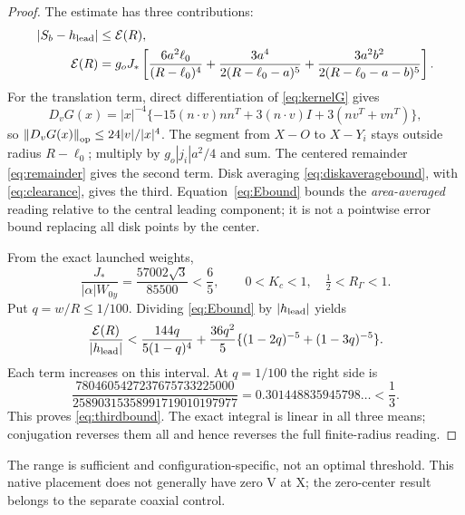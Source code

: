 \begin{proof}
The estimate has three contributions:
\begin{align}
|S_b-h_{\rm lead}|&\le\mathcal E(R),\label{eq:Ebound}\\
\mathcal E(R)&=g_oJ_*\left[
\frac{6a^2\ell_0}{(R-\ell_0)^4}
+\frac{3a^4}{2(R-\ell_0-a)^5}
+\frac{3a^2b^2}{2(R-\ell_0-a-b)^5}
\right].\notag
\end{align}
For the translation term, direct differentiation of \eqref{eq:kernelG} gives
\begin{equation}\label{eq:DG}
D_vG(x)=|x|^{-4}
\{-15(n\cdot v)nn^T+3(n\cdot v)I+3(nv^T+vn^T)\},
\end{equation}
so \(\left\lVert D_vG(x)\right\rVert_{\rm op}\le24|v|/|x|^4\). The segment from \(X-O\) to \(X-Y_i\) stays outside radius \(R-\ell_0\); multiply by \(g_o|j_i|a^2/4\) and sum. The centered remainder \eqref{eq:remainder} gives the second term. Disk averaging \eqref{eq:diskaveragebound}, with \eqref{eq:clearance}, gives the third. Equation~\eqref{eq:Ebound} bounds the \emph{area-averaged} reading relative to the central leading component; it is not a pointwise error bound replacing all disk points by the center.

From the exact launched weights,
\begin{equation}\label{eq:Jratio}
\frac{J_*}{|\alpha|W_{0y}}=\frac{57002\sqrt3}{85500}<\frac65,\qquad
0<K_c<1,\quad \tfrac12<R_\Gamma<1.
\end{equation}
Put \(q=w/R\le1/100\). Dividing \eqref{eq:Ebound} by \(|h_{\rm lead}|\) yields
\begin{equation}\label{eq:rationalbound}
\frac{\mathcal E(R)}{|h_{\rm lead}|}<
\frac{144q}{5(1-q)^4}
+\frac{36q^2}{5}\{(1-2q)^{-5}+(1-3q)^{-5}\}.
\end{equation}
Each term increases on this interval. At \(q=1/100\) the right side is
\begin{equation}\label{eq:rationalvalue}
\frac{7804605427237675733225000}{25890315358991719010197977}
=0.301448835945798\ldots<\frac13.
\end{equation}
This proves \eqref{eq:thirdbound}. The exact integral is linear in all three means; conjugation reverses them all and hence reverses the full finite-radius reading.
\end{proof}
The range is sufficient and configuration-specific, not an optimal threshold. This native placement does not generally have zero V at X; the zero-center result belongs to the separate coaxial control.

